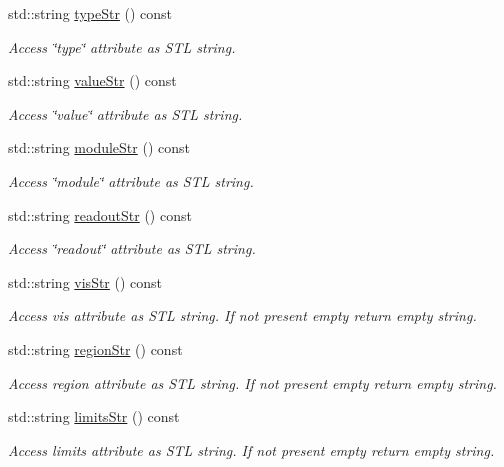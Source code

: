 \begin{DoxyCompactItemize}
std\+::string \hyperlink{struct_d_d4hep_1_1_x_m_l_1_1_child_value_a6b6daea7e0ea032070ab6adf9c3711c0}{type\+Str} () const
\begin{DoxyCompactList}\small\item\em Access \char`\"{}type\char`\"{} attribute as S\+TL string. \end{DoxyCompactList}\item 
std\+::string \hyperlink{struct_d_d4hep_1_1_x_m_l_1_1_child_value_afb03e28f5125a4d706d77e7e9da78bc0}{value\+Str} () const
\begin{DoxyCompactList}\small\item\em Access \char`\"{}value\char`\"{} attribute as S\+TL string. \end{DoxyCompactList}\item 
std\+::string \hyperlink{struct_d_d4hep_1_1_x_m_l_1_1_child_value_a5c4a413855fb7af65690083aa5d670b8}{module\+Str} () const
\begin{DoxyCompactList}\small\item\em Access \char`\"{}module\char`\"{} attribute as S\+TL string. \end{DoxyCompactList}\item 
std\+::string \hyperlink{struct_d_d4hep_1_1_x_m_l_1_1_child_value_ae9202ce86bf782e1395687f7829f18b7}{readout\+Str} () const
\begin{DoxyCompactList}\small\item\em Access \char`\"{}readout\char`\"{} attribute as S\+TL string. \end{DoxyCompactList}\item 
std\+::string \hyperlink{struct_d_d4hep_1_1_x_m_l_1_1_child_value_ad3ddf5f5c701b7a14f35571c2283c79b}{vis\+Str} () const
\begin{DoxyCompactList}\small\item\em Access vis attribute as S\+TL string. If not present empty return empty string. \end{DoxyCompactList}\item 
std\+::string \hyperlink{struct_d_d4hep_1_1_x_m_l_1_1_child_value_aa0062a28cc4f40dc67a8ff58e70b53c6}{region\+Str} () const
\begin{DoxyCompactList}\small\item\em Access region attribute as S\+TL string. If not present empty return empty string. \end{DoxyCompactList}\item 
std\+::string \hyperlink{struct_d_d4hep_1_1_x_m_l_1_1_child_value_a53c62147a2bce84a7fd010e8aae0f013}{limits\+Str} () const
\begin{DoxyCompactList}\small\item\em Access limits attribute as S\+TL string. If not present empty return empty string. \end{DoxyCompactList}\end{DoxyCompactItemize}
